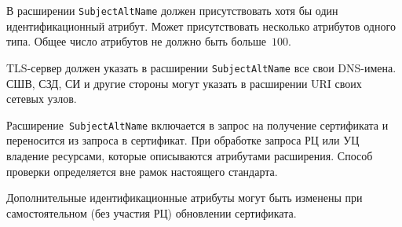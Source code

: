 В расширении \texttt{SubjectAltName} должен присутствовать хотя бы один 
идентификационный атрибут. Может присутствовать несколько атрибутов одного 
типа. Общее число атрибутов не должно быть больше~$100$.

TLS-сервер должен указать в расширении \texttt{SubjectAltName}
все свои DNS-имена. СШВ, СЗД, СИ и другие стороны могут указать в 
расширении URI своих сетевых узлов.

Расширение~\texttt{SubjectAltName} включается в запрос на получение
сертификата и переносится из запроса в сертификат. При  обработке запроса  РЦ или УЦ  владение ресурсами, которые описываются атрибутами расширения.
%
Способ проверки определяется вне рамок настоящего стандарта.

Дополнительные идентификационные атрибуты могут быть изменены при 
самостоятельном (без участия РЦ) обновлении сертификата.

